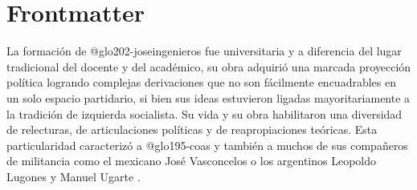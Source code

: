 \newif\ifPDF%
\newif\ifBNPDF%
\newif\ifEPUB%
\newif\ifHTML%
\newif\ifHTMLcinco%
\newif\ifJATS%
\newif\ifODT%

 \ODTtrue





\ifODT
\usepackage[unicode,hyperindex=true]{hyperref}
\else
	\ifPDF
	\usepackage[hyphenation,homeoarchy,draft,homeoarchywordcolor=yellow,homeoarchycharcolor=yellow]{impnattypo}
	\usepackage[allcolors=magenta,colorlinks]{hyperref}
	\usepackage{hyperxmp}
	
	\else
		\ifBNPDF
		\usepackage[cam,width=18truecm,height=25.5truecm,center]{crop}
		\usepackage[hidelinks]{hyperref}
		\usepackage{hyperxmp}
		
		\else
			\ifEPUB
			\usepackage[hyperindex=true,allcolors=magenta,colorlinks]{hyperref}
			\fi
		\fi
	\fi
\fi


\frontmatter

\ifEPUB%
	\ifdefined\HCode
	\phantomsection
	\addcontentsline{toc}{section}{Portada}
	\coverimage{./media/cover.png}
	\clearpage
	\fi
\fi

\ifPDF

\else
	\ifBNPDF
	
	\fi
\fi

\tableofcontents

\chapter{Frontmatter}

La formación de \gls{@glo202-joseingenieros} fue universitaria y a diferencia del lugar tradicional del docente y del académico, su obra adquirió una marcada proyección política logrando complejas derivaciones que no son fácilmente encuadrables en un solo espacio partidario, si bien sus ideas estuvieron ligadas mayoritariamente a la tradición de izquierda socialista. Su vida y su obra habilitaron una diversidad de relecturas, de articulaciones políticas y de reapropiaciones teóricas. Esta particularidad caracterizó a \gls{@glo195-coas} y también a muchos de sus compañeros de militancia como el mexicano José Vasconcelos o los argentinos Leopoldo Lugones y Manuel Ugarte \parencite{@3070-TARKOVSKI1995}.

